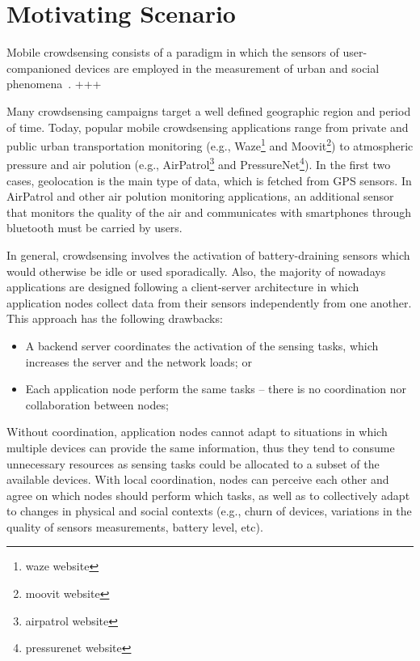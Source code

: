 \section{Motivating Scenario}


Mobile crowdsensing consists of a paradigm in which the sensors of user-companioned devices are employed in the measurement of urban and social phenomena~\cite{}. +++

Many crowdsensing campaigns target a well defined geographic region and period of time. 
Today, popular mobile crowdsensing applications range from private and public urban transportation monitoring (e.g., Waze\footnote{waze website} and Moovit\footnote{moovit website}) to atmospheric pressure and air polution (e.g., AirPatrol\footnote{airpatrol website} and PressureNet\footnote{pressurenet website}). In the first two cases, geolocation is the main type of data, which is fetched from GPS sensors. In AirPatrol and other air polution monitoring applications, an additional sensor that monitors the quality of the air and communicates with smartphones through bluetooth must be carried by users. 

In general, crowdsensing involves the activation of battery-draining sensors which would otherwise be idle or used sporadically. Also, the majority of nowadays applications are designed following a client-server architecture in which application nodes collect data from their sensors independently from one another. This approach has the following drawbacks:

\begin{itemize}
	
	\item A backend server coordinates the activation of the sensing tasks, which increases the server and the network loads; or
	
	\item Each application node perform the same tasks -- there is no coordination nor collaboration between nodes; 
	
\end{itemize}

Without coordination, application nodes cannot adapt to situations in which multiple devices can provide the same information, thus they tend to consume unnecessary resources as sensing tasks could be allocated to a subset of the available devices. With local coordination, nodes can perceive each other and agree on which nodes should perform which tasks, as well as to collectively adapt to changes in physical and social contexts (e.g., churn of devices, variations in the quality of sensors measurements, battery level, etc). 

